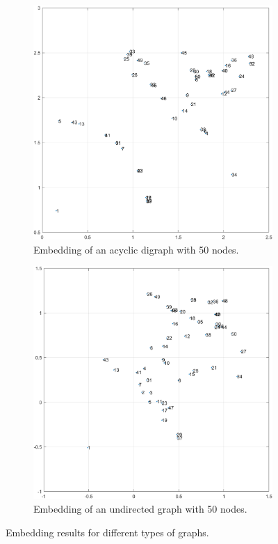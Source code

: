 \documentclass[letterpaper, 10 pt, conference]{ieeeconf}  %
\begin{document}
\begin{figure}[h]
    \begin{center}
    \begin{subfigure}[b]{0.45\textwidth}
        \includegraphics[width=\textwidth]{IMG/ag_50nodes.png}
        \caption{Embedding of an acyclic digraph with 50 nodes.}
        \label{fig:ag_50nodes}
    \end{subfigure}
    \hfill
    \begin{subfigure}[b]{0.45\textwidth}
        \includegraphics[width=\textwidth]{IMG/ug_50nodes.png}
        \caption{Embedding of an undirected graph with 50 nodes.}
        \label{fig:ug_50nodes}
    \end{subfigure}
    \caption{Embedding results for different types of graphs.}
    \end{center}
\end{figure}
\end{document}
